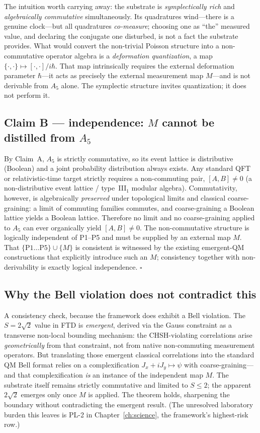 The intuition worth carrying away: the substrate is \emph{symplectically rich}
and \emph{algebraically commutative} simultaneously. Its quadratures wind---there
is a genuine clock---but all quadratures \emph{co-measure}; choosing one as
``the'' measured value, and declaring the conjugate one disturbed, is not a fact
the substrate provides. What would convert the non-trivial Poisson structure into
a non-commutative operator algebra is a \emph{deformation quantization}, a map
$\{\cdot,\cdot\}\mapsto[\cdot,\cdot]/i\hbar$. That map intrinsically requires the
external deformation parameter $\hbar$---it acts as precisely the external
measurement map $M$---and is not derivable from $A_5$ alone. The symplectic
structure invites quantization; it does not perform it.

\subsection*{Claim B --- independence: $M$ cannot be distilled from $A_5$}

By Claim~A, $A_5$ is strictly commutative, so its event lattice is distributive
(Boolean) and a joint probability distribution always exists. Any standard QFT or
relativistic-time target strictly requires a non-commuting pair, $[A,B]\neq 0$
(a non-distributive event lattice / type~III$_1$ modular algebra).
Commutativity, however, is algebraically \emph{preserved} under topological
limits and classical coarse-graining: a limit of commuting families commutes, and
coarse-graining a Boolean lattice yields a Boolean lattice. Therefore no limit
and no coarse-graining applied to $A_5$ can ever organically yield
$[A,B]\neq 0$. The non-commutative structure is logically independent of P1--P5
and must be supplied by an external map $M$. That
$\{\mathrm{P1\ldots P5}\}\cup\{M\}$ is consistent is witnessed by the existing
emergent-QM constructions that explicitly introduce such an $M$; consistency
together with non-derivability is exactly logical independence. \hfill$\square$

\subsection*{Why the Bell violation does not contradict this}

A consistency check, because the framework does exhibit a Bell violation. The
$S=2\sqrt2$ value in FTD is \emph{emergent}, derived via the Gauss constraint as
a transverse non-local bounding mechanism: the CHSH-violating correlations arise
\emph{geometrically} from that constraint, not from native non-commuting
measurement operators. But translating those emergent classical correlations into
the standard QM Bell format relies on a complexification
$J_x + iJ_y \mapsto \psi$ with coarse-graining---and that complexification
\emph{is} an instance of the independent map $M$. The substrate itself remains
strictly commutative and limited to $S\le 2$; the apparent $2\sqrt2$ emerges only
once $M$ is applied. The theorem holds, sharpening the boundary without
contradicting the emergent result. (The unresolved laboratory burden this leaves
is PL-2 in Chapter~\ref{ch:science}, the framework's highest-risk row.)

